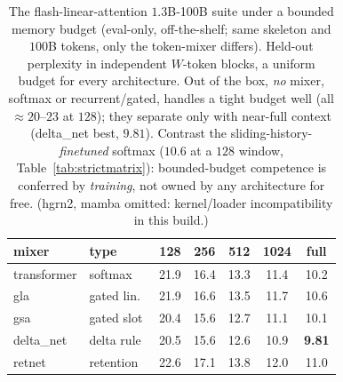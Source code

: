 \begin{table}[t]
\centering
\footnotesize
\setlength{\tabcolsep}{4pt}
\begin{tabular}{llccccc}
\toprule
mixer & type & 128 & 256 & 512 & 1024 & full \\
\midrule
transformer & softmax     & 21.9 & 16.4 & 13.3 & 11.4 & 10.2 \\
gla         & gated lin.\ & 21.9 & 16.6 & 13.5 & 11.7 & 10.6 \\
gsa         & gated slot  & 20.4 & 15.6 & 12.7 & 11.1 & 10.1 \\
delta\_net  & delta rule  & 20.5 & 15.6 & 12.6 & 10.9 & \textbf{9.81} \\
retnet      & retention   & 22.6 & 17.1 & 13.8 & 12.0 & 11.0 \\
\bottomrule
\end{tabular}
\caption{The flash-linear-attention $1.3$B-100B suite under a bounded memory budget (eval-only, off-the-shelf; same skeleton and $100$B tokens, only the token-mixer differs). Held-out perplexity in independent $W$-token blocks, a uniform budget for every architecture. Out of the box, \emph{no} mixer, softmax or recurrent/gated, handles a tight budget well (all $\approx$$20$--$23$ at $128$); they separate only with near-full context (delta\_net best, $9.81$). Contrast the sliding-history-\emph{finetuned} softmax ($10.6$ at a $128$ window, Table~\ref{tab:strictmatrix}): bounded-budget competence is conferred by \emph{training}, not owned by any architecture for free. (hgrn2, mamba omitted: kernel/loader incompatibility in this build.)}
\label{tab:suite}
\end{table}

